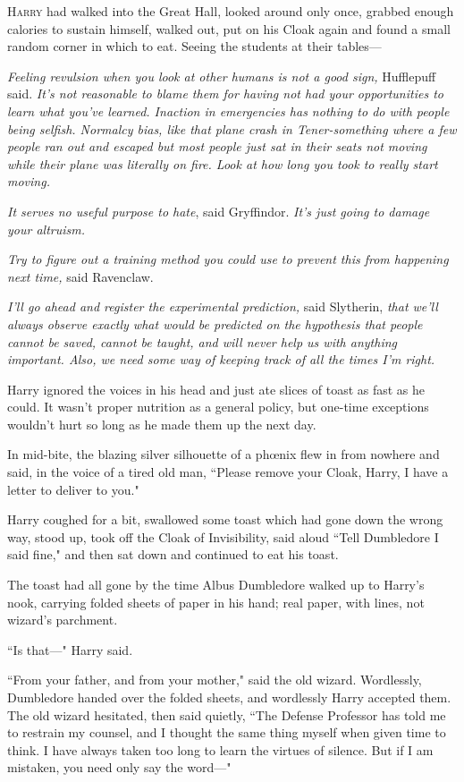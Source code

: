 
\lettrine{H}{arry} had walked into the Great Hall, looked around only once, grabbed enough calories to sustain himself, walked out, put on his Cloak again and found a small random corner in which to eat. Seeing the students at their tables—

\emph{Feeling revulsion when you look at other humans is not a good sign,} Hufflepuff said. \emph{It's not reasonable to blame them for having not had your opportunities to learn what you've learned. Inaction in emergencies has nothing to do with people being selfish. Normalcy bias, like that plane crash in Tener-something where a few people ran out and escaped but most people just sat in their seats not moving while their plane was literally on fire. Look at how long \emph{you} took to really start moving.}

\emph{It serves no useful purpose to hate}, said Gryffindor. \emph{It's just going to damage your altruism.}

\emph{Try to figure out a training method you could use to prevent this from happening next time,} said Ravenclaw.

\emph{I'll go ahead and register the experimental prediction,} said Slytherin, \emph{that we'll always observe exactly what would be predicted on the hypothesis that people cannot be saved, cannot be taught, and will never help us with anything important. Also, we need some way of keeping track of all the times I'm right.}

Harry ignored the voices in his head and just ate slices of toast as fast as he could. It wasn't proper nutrition as a general policy, but one-time exceptions wouldn't hurt so long as he made them up the next day.

In mid-bite, the blazing silver silhouette of a phœnix flew in from nowhere and said, in the voice of a tired old man, ``Please remove your Cloak, Harry, I have a letter to deliver to you."

Harry coughed for a bit, swallowed some toast which had gone down the wrong way, stood up, took off the Cloak of Invisibility, said aloud ``Tell Dumbledore I said fine," and then sat down and continued to eat his toast.

The toast had all gone by the time Albus Dumbledore walked up to Harry's nook, carrying folded sheets of paper in his hand; real paper, with lines, not wizard's parchment.

``Is that—" Harry said.

``From your father, and from your mother," said the old wizard. Wordlessly, Dumbledore handed over the folded sheets, and wordlessly Harry accepted them. The old wizard hesitated, then said quietly, ``The Defense Professor has told me to restrain my counsel, and I thought the same thing myself when given time to think. I have always taken too long to learn the virtues of silence. But if I am mistaken, you need only say the word—"

